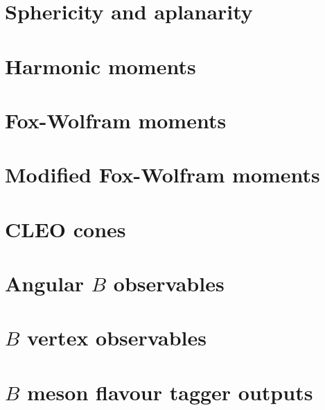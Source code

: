 \section{Sphericity and aplanarity}\label{sec:sphericity_aplanarity}

\newpage

\section{Harmonic moments}\label{sec:harmonic_moments}

\newpage

\section{Fox-Wolfram moments}\label{sec:fox_wolfram_moments}

\newpage

\section{Modified Fox-Wolfram moments}\label{sec:modified_fox_wolfram_moments}

\newpage

\section{CLEO cones}\label{sec:cleo_cones}

\newpage

\section{Angular \texorpdfstring{$B$}{B} observables}\label{sec:angular_features}

\newpage

\section{\texorpdfstring{$B$}{B} vertex observables}\label{sec:vertex_features}

\newpage

\section{\texorpdfstring{$B$}{B} meson flavour tagger outputs}\label{sec:flavour_tagger_outputs}
